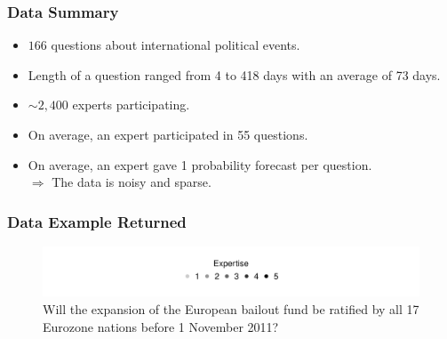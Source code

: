 \documentclass{beamer}
\begin{document}
\begin{frame}
\frametitle{Data Summary}
\begin{itemize}
\item $166$ questions about international political events.
\item Length of a question ranged from 4 to 418 days with an average of 73 days.
\item  $\sim 2,400$ experts participating.
\item On average, an expert participated in 55 questions.
\item On average, an expert gave 1 probability forecast per question.\\
\vspace{1em}
 $\Rightarrow$ The data is noisy and sparse.
\end{itemize}


\end{frame}


\begin{frame}
\frametitle{Data Example Returned}

\begin{figure}[h!]
\centering
\vspace{-1.5em}
	\includegraphics[width=  \textwidth]{LegendExamplePlot} %
\vspace{-1.5em}


\caption{Will the expansion of the European bailout fund be ratified by all 17 Eurozone nations before 1 November 2011?}
\label{ExamplePlots}
\end{figure}
\end{frame}
\end{document}

